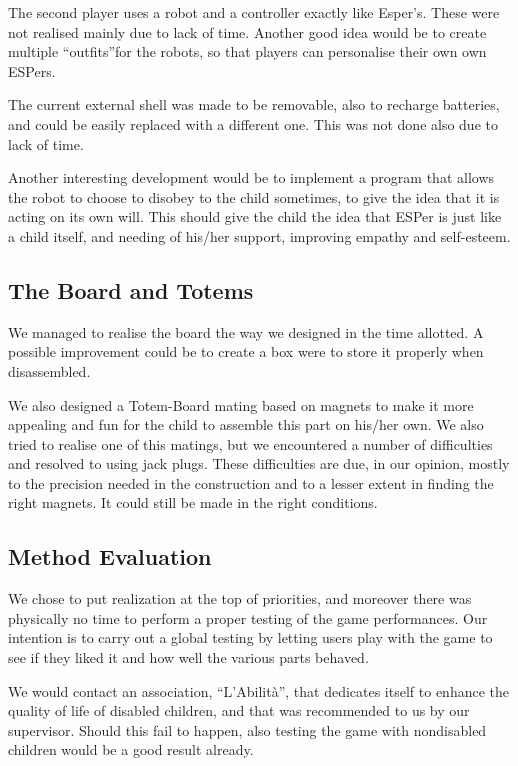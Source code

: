 \documentclass[a4paper,twoside]{book}
\begin{document}
The second player uses a robot and a controller exactly like Esper's. These were not realised mainly due to lack of time. Another good idea would be to create multiple \textquotedblleft outfits\textquotedblright for the robots, so that players can  personalise their own own ESPers.

The current external shell was made to be removable, also to recharge batteries, and could be easily replaced with a different one. This was not done also due to lack of time. 

Another interesting development would be to implement a program that allows the robot to choose to disobey to the child sometimes, to give the idea that it is acting on its own will. This should give the child the idea that ESPer is just like a child itself, and needing of his/her support, improving empathy and self-esteem.

\subsection*{The Board and Totems}

We managed to realise the board the way we designed in the time allotted. A possible improvement could be to create a box were to store it properly when disassembled. 

We also designed a Totem-Board mating based on magnets to make it more appealing and fun for the child to assemble this part on his/her own. We also tried to realise one of this matings, but we encountered a number of difficulties and resolved to using jack plugs. These difficulties are due, in our opinion, mostly to the precision needed in the construction and  to a lesser extent in finding the right magnets. It could still be made in the right conditions.

\subsection*{Method Evaluation}

We chose to put realization at the top of priorities, and moreover there was physically no time to perform a proper testing of the game performances. Our intention is to carry out a global testing by letting users play with the game to see if they liked it and how well the various parts behaved.

We would contact an association, \textquotedblleft L'Abilit\`{a}\textquotedblright , that dedicates itself to enhance the quality of life of disabled children, and that was recommended to us by our supervisor. Should this fail to happen, also testing the game with non\textendash disabled children would be a good result already.
\end{document}
